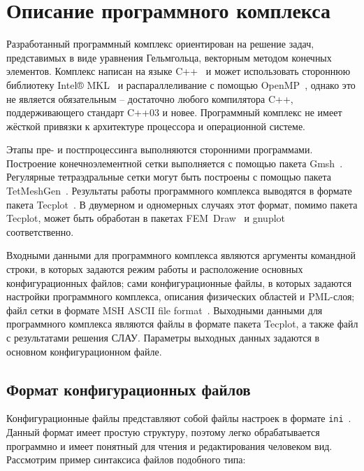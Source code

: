 \documentclass[a4paper,14pt]{article}
\makeatletter
\newcommand{\labelname}[1]{%
	\def\@currentlabelname{#1}}%
\newcommand{\CodeFont}[1]{{\small{\texttt{#1}}}}
\makeatother
\begin{document}

\clearpage
\section{Описание программного комплекса}
\labelname{4}\label{sec:program_description}
Разработанный программный комплекс ориентирован на решение задач, представимых в виде уравнения Гельмгольца, векторным методом конечных элементов. Комплекс написан на языке C++~\citep{cpp_2003} и может использовать стороннюю библиотеку Intel® MKL~\citep{intel_mkl} и распараллеливание с помощью OpenMP~\citep{openmp}, однако это не является обязательным -- достаточно любого компилятора C++, поддерживающего стандарт C++03 и новее. Программный комплекс не имеет жёсткой привязки к архитектуре процессора и операционной системе.

Этапы пре- и постпроцессинга выполняются сторонними программами. Построение конечноэлементной сетки выполняется с помощью пакета Gmsh~\citep{gmsh_article}. Регулярные тетраэдральные сетки могут быть построены с помощью пакета TetMeshGen~\citep{tet_mesh_gen}. Результаты работы программного комплекса выводятся в формате пакета Tecplot~\citep{tecplot}. В двумерном и одномерных случаях этот формат, помимо пакета Tecplot, может быть обработан в пакетах FEM~Draw~\citep{fem_draw} и gnuplot~\citep{gnuplot} соответственно.

Входными данными для программного комплекса являются аргументы командной строки, в которых задаются режим работы и расположение основных конфигурационных файлов; сами конфигурационные файлы, в которых задаются настройки программного комплекса, описания физических областей и PML-слоя; файл сетки в формате MSH ASCII file format~\citep{gmsh_doc}. Выходными данными для программного комплекса являются файлы в формате пакета Tecplot, а также файл с результатами решения СЛАУ. Параметры выходных данных задаются в основном конфигурационном файле.

\subsection{Формат конфигурационных файлов}
Конфигурационные файлы представляют собой файлы настроек в формате \CodeFont{ini}~\citep{ini_format}. Данный формат имеет простую структуру, поэтому легко обрабатывается программно и имеет понятный для чтения и редактирования человеком вид. Рассмотрим пример синтаксиса файлов подобного типа:
\end{document}
